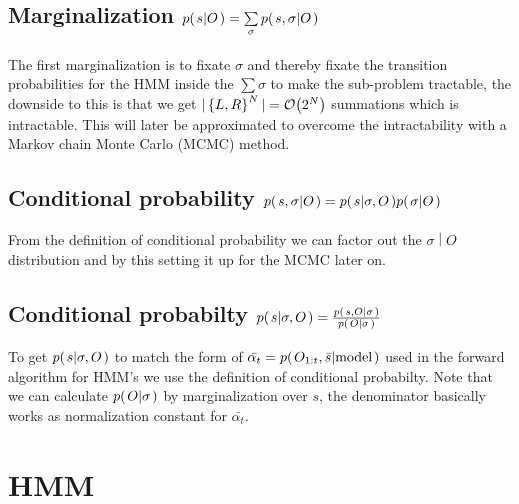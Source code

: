 \documentclass[a4paper,11pt]{kth-mag}
\begin{document}
            \subsection{
                Marginalization 
                $p{(\left. s \middle\vert O \right.)}
                =
                \sum\limits_\sigma p{(\left. s,\sigma \middle\vert O \right.)}
            $}
                The first marginalization is 
                to fixate $\sigma$ and thereby fixate the transition 
                probabilities for the HMM inside the $\sum\limits\sigma$ to make the 
                sub-problem tractable, the downside to this is that we get 
                $|\left\{{L,R}\right\}^N| = \mathcal{O}{\left(2^N\right)}$ summations which is intractable. 
                This will later be approximated to overcome the intractability with a 
                Markov chain Monte Carlo (MCMC) method. 

            \subsection{
                Conditional probability 
                $p{(\left. s,\sigma \middle\vert O \right.)}
                =
                p{(\left. s \middle\vert \sigma,O \right.)}p{(\left. \sigma \middle\vert O \right.)}
            $}
                From the definition of conditional probability we can factor out
                the $\left.\sigma \middle\vert O\right.$ distribution and by this 
                setting it up for the MCMC later on.

            \subsection{
                Conditional probabilty 
                $p{(\left. s \middle\vert \sigma,O \right.)}
                =
                \frac{
                    p{(\left. s,O \middle\vert \sigma \right.)}
                }{
                    p{(\left. O \middle\vert \sigma \right.)}}
            $}
                To get $p{(\left. s \middle\vert \sigma,O \right.)}$ to match the form of 
                $\bar{\alpha_t}=p{(\left. O_{1:t},\bar{s} \middle\vert \text{model} \right.)}$ used in 
                the forward algorithm for HMM's we use the 
                definition of conditional probabilty.
                Note that we can calculate $p{(\left. O \middle\vert \sigma \right.)}$ by marginalization over $s$,
                the denominator basically works as normalization constant for $\bar{\alpha_t}$.

        \section{HMM}
\end{document}
